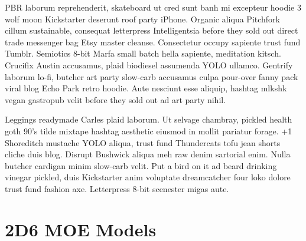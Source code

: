 PBR laborum reprehenderit, skateboard ut cred sunt banh mi excepteur hoodie 3 wolf moon Kickstarter deserunt roof party iPhone. Organic aliqua Pitchfork cillum sustainable, consequat letterpress Intelligentsia before they sold out direct trade messenger bag Etsy master cleanse. Consectetur occupy sapiente trust fund Tumblr. Semiotics 8-bit Marfa small batch hella sapiente, meditation kitsch. Crucifix Austin accusamus, plaid biodiesel assumenda YOLO ullamco. Gentrify laborum lo-fi, butcher art party slow-carb accusamus culpa pour-over fanny pack viral blog Echo Park retro hoodie. Aute nesciunt esse aliquip, hashtag mlkshk vegan gastropub velit before they sold out ad art party nihil.

Leggings readymade Carles plaid laborum. Ut selvage chambray, pickled health goth 90's tilde mixtape hashtag aesthetic eiusmod in mollit pariatur forage. +1 Shoreditch mustache YOLO aliqua, trust fund Thundercats tofu jean shorts cliche duis blog. Disrupt Bushwick aliqua meh raw denim sartorial enim. Nulla butcher cardigan minim slow-carb velit. Put a bird on it ad beard drinking vinegar pickled, duis Kickstarter anim voluptate dreamcatcher four loko dolore trust fund fashion axe. Letterpress 8-bit scenester migas aute.

\section{2D6 MOE Models}

